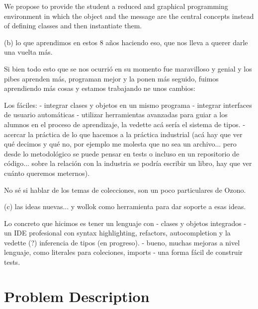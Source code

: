 \documentclass[preprint,10pt]{sigplanconf}
\begin{document}

\medskip 

We propose to provide the student a reduced and graphical
programming environment in which the object and the message are
the central concepts instead of defining classes and then instantiate
them. \cite{griggio_programming_2011}



\medskip 


(b) lo que aprendimos en estos 8 años haciendo eso, que nos lleva a querer darle una vuelta más.

Si bien todo esto que se nos ocurrió en su momento fue maravilloso y genial y los pibes aprenden más, programan mejor y la ponen más seguido, fuimos aprendiendo más cosas y estamos trabajando ne unos cambios:

Los fáciles:
- integrar clases y objetos en un mismo programa
- integrar interfaces de usuario automáticas
- utilizar herramientas avanzadas para guiar a los alumnos en el proceso de aprendizaje, la vedette acá sería el sistema de tipos.
- acercar la práctica de lo que hacemos a la práctica industrial (acá hay que ver qué decimos y qué no, por ejemplo me molesta que no sea un archivo... pero desde lo metodológico se puede pensar en tests o incluso en un repositorio de código... sobre la relación con la industria se podría escribir un libro, hay que ver cuánto queremos meternos).

No sé si hablar de los temas de colecciones, son un poco particulares de Ozono.


\medskip 

(c) las ideas nuevas... y wollok como herramienta para dar soporte a esas ideas.

Lo concreto que hicimos es tener un lenguaje con
- clases y objetos integrados
- un IDE profesional con syntax highlighting, refactors, autocompletion y la vedette (?) inferencia de tipos (en progreso).
- bueno, muchas mejoras a nivel lenguaje, como literales para coleciones, imports
- una forma fácil de construir tests.

\medskip 



\section{Problem Description}
\label{sec:problem}
\end{document}
